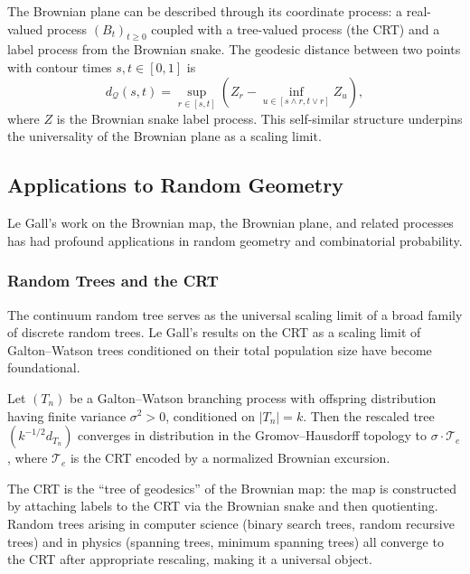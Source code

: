 \begin{remark}[Coordinates]
The Brownian plane can be described through its coordinate process: a real-valued process $(B_t)_{t \geq 0}$ coupled with a tree-valued process (the CRT) and a label process from the Brownian snake. The geodesic distance between two points with contour times $s, t \in [0,1]$ is
\[
    d_{\mathcal{Q}}(s,t) = \sup_{r \in [s,t]} \left( Z_r - \inf_{u \in [s \wedge r, t \vee r]} Z_u \right),
\]
where $Z$ is the Brownian snake label process. This self-similar structure underpins the universality of the Brownian plane as a scaling limit.
\end{remark}

\subsection{Applications to Random Geometry}

Le Gall's work on the Brownian map, the Brownian plane, and related processes has had profound applications in random geometry and combinatorial probability.

\subsubsection{Random Trees and the CRT}

The continuum random tree serves as the universal scaling limit of a broad family of discrete random trees. Le Gall's results on the CRT as a scaling limit of Galton--Watson trees conditioned on their total population size have become foundational.

\begin{proposition}[Le Gall, 1993]
Let $(T_n)$ be a Galton--Watson branching process with offspring distribution having finite variance $\sigma^2 > 0$, conditioned on $|T_n| = k$. Then the rescaled tree $(k^{-1/2} d_{T_n})$ converges in distribution in the Gromov--Hausdorff topology to $\sigma \cdot \mathcal{T}_e$, where $\mathcal{T}_e$ is the CRT encoded by a normalized Brownian excursion.
\end{proposition}

The CRT is the ``tree of geodesics'' of the Brownian map: the map is constructed by attaching labels to the CRT via the Brownian snake and then quotienting. Random trees arising in computer science (binary search trees, random recursive trees) and in physics (spanning trees, minimum spanning trees) all converge to the CRT after appropriate rescaling, making it a universal object.

